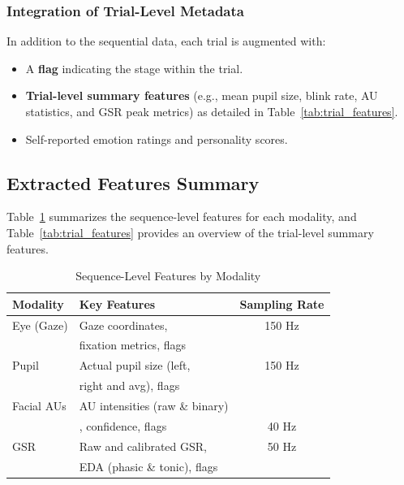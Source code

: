 \documentclass[sigconf]{acmart}
\begin{document}
\subsubsection{Integration of Trial-Level Metadata}
In addition to the sequential data, each trial is augmented with:
\begin{itemize}
    \item A \textbf{flag} indicating the stage within the trial.
    \item \textbf{Trial-level summary features} (e.g., mean pupil size, blink rate, AU statistics, and GSR peak metrics) as detailed in Table~\ref{tab:trial_features}.
    \item Self-reported emotion ratings and personality scores.
\end{itemize}

\subsection{Extracted Features Summary}

Table~\ref{tab:sequence_features} summarizes the sequence-level features for each modality, and Table~\ref{tab:trial_features} provides an overview of the trial-level summary features.

\begin{table}[ht]
\centering
\caption{Sequence-Level Features by Modality}
\label{tab:sequence_features}
\begin{tabular}{llc}
\toprule
\textbf{Modality} & \textbf{Key Features} & \textbf{Sampling Rate} \\
\midrule
Eye (Gaze)    & Gaze coordinates, & 150 Hz \\
   & fixation metrics, flags &  \\
Pupil         & Actual pupil size (left, & 150 Hz \\
         & right and avg), flags &  \\
Facial AUs    & AU intensities (raw \& binary) \\
    & , confidence, flags & 40 Hz \\
GSR           & Raw and calibrated GSR,& 50 Hz \\
          & EDA (phasic \& tonic), flags &  \\
\bottomrule
\end{tabular}
\end{table}
\end{document}
